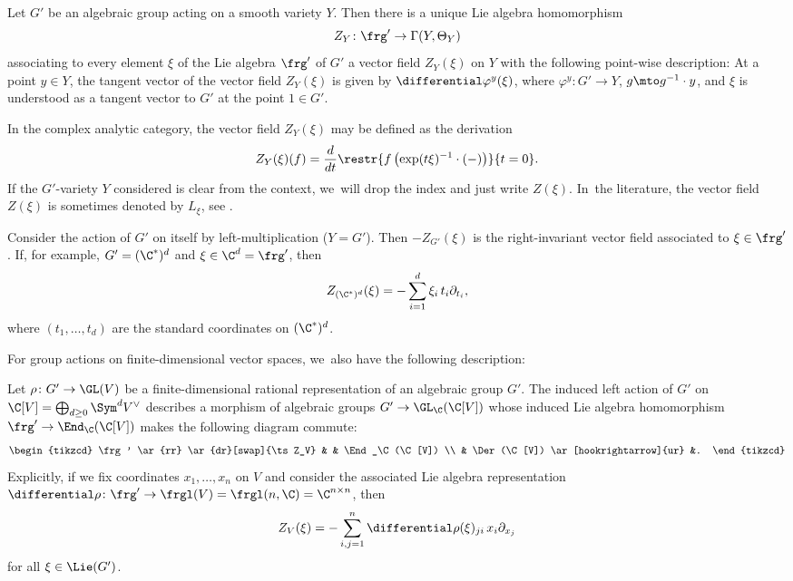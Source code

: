 \begin{lem} \label{lem:defEquivVF}
Let $G'$ be an algebraic group acting on a smooth variety $Y$. Then there is a unique Lie algebra homomorphism\vspace*{-3pt}
\[
Z_Y \colon \frg' \to \Gamma(Y,\Theta_Y)
\]
associating to every element $\xi$ of the Lie algebra $\frg'$ of $G'$ a vector field $Z_Y(\xi)$ on $Y$ with the following point-wise description: At a point $y \in Y$, the tangent vector of the vector field $Z_Y(\xi)$ is given by $\differential \varphi^y(\xi)$, where $\varphi^y \colon G' \to Y$, $g \mto g^{-1} \cdot y$, and $\xi$ is understood as a tangent vector to $G'$ at the point $1 \in G'$.
\end{lem}

In the complex analytic category, the vector field $Z_Y(\xi)$ may be defined as the derivation\vspace*{-3pt}
\[
Z_Y(\xi)(f) = \frac{d}{dt} \restr{f\left(\exp(t\xi)^{-1} \cdot {(-)}\right)}{t=0}.
\]
If the $G'$-variety $Y$ considered is clear from the context, we~will drop the index and just write $Z(\xi)$. In~the literature, the vector field $Z(\xi)$ is sometimes denoted by $L_\xi$, see \eg \cite[II.2]{Hot98}.

\begin{exa}
Consider the action of $G'$ on itself by left-multiplication \hbox{(\ie $Y\!=\! G'$)}. Then $-Z_{G'}(\xi)$ is the right-invariant vector field associated to $\xi \in \frg'$. If, for example, $G' = (\C^*)^d$ and $\xi \in \C^d = \frg'$, then\vspace*{-3pt}
\[
Z_{(\C^*)^d}(\xi) = -\sum_{i=1}^d \xi_i \, t_i \partial_{t_i},
\]
where $(t_1,\dots,t_d)$ are the standard coordinates on $(\C^*)^d$.
\end{exa}

For group actions on finite-dimensional vector spaces, we~also have the following description:

\begin{lem} \label{lem:equivVFOnVectSp}
Let $\rho \colon G' \to \GL(V)$ be a finite-dimensional rational representation of an algebraic group $G'$. The induced left action of $G'$ on $\C[V] = \bigoplus_{d\geq 0} \Sym^d V^\vee$ describes a morphism of algebraic groups $G' \to \GL_\C(\C[V])$ whose induced Lie algebra homomorphism $\frg' \to \End_\C(\C[V])$ makes the following diagram commute:\vspace*{-3pt}
\[
\begin{tikzcd}
\frg' \ar{rr} \ar{dr}[swap]{\ts Z_V} & & \End_\C(\C[V]) \\
& \Der(\C[V]) \ar[hookrightarrow]{ur} &.
\end{tikzcd}
\]
Explicitly, if we fix coordinates $x_1, \ldots, x_n$ on $V$ and consider the associated Lie algebra representation $\differential\rho \colon \frg' \to \frgl(V) = \frgl(n,\C) = \C^{n\times n}$, then\vspace*{-3pt}
\[
Z_V(\xi) = -\sum_{i,j=1}^n \differential\rho(\xi)_{ji} \, x_i \partial_{x_j}
\]
for all $\xi \in \Lie(G')$.
\end{lem}


